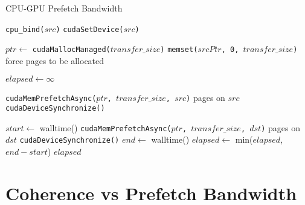 \begin{algorithm}
	\caption{CPU-GPU Prefetch Bandwidth}
	\label{alg:um-prefetch-bw}
	\begin{algorithmic}[1]
		\Statex
				
		\State \texttt{cpu\_bind($src$)}
		\Else
		\State \texttt{cudaSetDevice($src$)}
		\EndIf
				
		\State $ptr \gets$ \texttt{cudaMallocManaged($transfer\_size$)}
		\State \texttt{memset($srcPtr$, 0, $transfer\_size$)} \Comment force pages to be allocated
				
		\State $elapsed \gets \infty$
				
		\State \texttt{cudaMemPrefetchAsync($ptr$, $transfer\_size$, $src$)} \Comment pages on $src$
		\State \texttt{cudaDeviceSynchronize()}
				
		\State $start \gets$ walltime()
		\State \texttt{cudaMemPrefetchAsync($ptr$, $transfer\_size$, $dst$)} \Comment pages on $dst$
		\State \texttt{cudaDeviceSynchronize()}
		\State $end \gets$ walltime()
		\State $elapsed \gets$ min($elapsed$, $end-start$)
		\EndFor
		\State \Return $elapsed$
		\EndFunction
				
	\end{algorithmic}
\end{algorithm}

\section{Coherence vs Prefetch Bandwidth}

